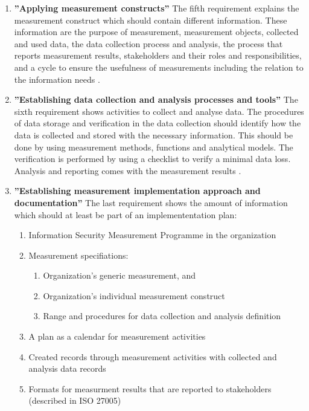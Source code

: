 \begin{enumerate}[label=(\alph*)]
  \item \label{itm:e} \textbf{''Applying measurement constructs''}
  The fifth requirement explains the measurement construct which should contain different information. These information are the purpose of measurement, measurement objects, collected and used data, the data collection process and analysis, the process that reports measurement results, stakeholders and their roles and responsibilities, and a cycle to ensure the usefulness of measurements including the relation to the information needs \cite{ISO_27004_2009}. \\

  \item \label{itm:f} \textbf{''Establishing data collection and analysis processes and tools''}
  The sixth requirement shows activities to collect and analyse data. The procedures of data storage and verification in the data collection should identify how the data is collected and stored with the necessary information. This should be done by using measurement methods, functions and analytical models. The verification is performed by using a checklist to verify a minimal data loss. \\
  Analysis and reporting comes with the measurement results \cite{ISO_27004_2009}.  \\

  \item \label{itm:g} \textbf{''Establishing measurement implementation approach and documentation''}
  The last requirement shows the amount of information which should at least be part of an implemententation plan:

  \begin{enumerate}
    \item Information Security Measurement Programme in the organization
    \item Measurement specifiations:
      \begin{enumerate}
        \item Organization's generic measurement, and
        \item Organization's individual measurement construct
        \item Range and procedures for data collection and analysis definition
      \end{enumerate}
      \item A plan as a calendar for measurement activities
      \item Created records through measurement activities with collected and analysis data records
      \item Formats for measurment results that are reported to stakeholders (described in ISO 27005)
  \end{enumerate}

  \cite{ISO_27004_2009}
\end{enumerate}

